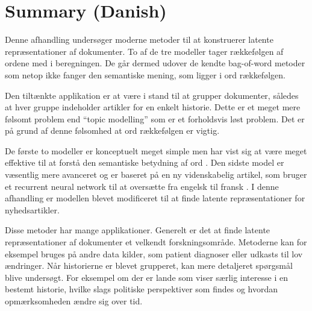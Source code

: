 \chapter{Summary (Danish)}

Denne afhandling undersøger moderne metoder til at konstruerer latente repræsentationer af dokumenter. To af de tre modeller tager rækkefølgen af ordene med i beregningen. De går dermed udover de kendte bag-of-word metoder som netop ikke fanger den semantiske mening, som ligger i ord rækkefølgen.

Den tiltænkte applikation er at være i stand til at grupper dokumenter, således at hver gruppe indeholder artikler for en enkelt historie. Dette er et meget mere følsomt problem end ``topic modelling'' som er et forholdsvis løst problem. Det er på grund af denne følsomhed at ord rækkefølgen er vigtig.

De første to modeller er konceptuelt meget simple men har vist sig at være meget effektive til at forstå den semantiske betydning af ord \cite{word2vec-details, doc2vec}. Den sidste model er væsentlig mere avanceret og er baseret på en ny videnskabelig artikel, som bruger et recurrent neural network til at oversætte fra engelsk til fransk \cite{sutskever}. I denne afhandling er modellen blevet modificeret til at finde latente repræsentationer for nyhedsartikler.

Disse metoder har mange applikationer. Generelt er det at finde latente repræsentationer af dokumenter et velkendt forskningsområde. Metoderne kan for eksempel bruges på andre data kilder, som patient diagnoser eller udkasts til lov ændringer.
Når historierne er blevet grupperet, kan mere detaljeret spørgsmål blive undersøgt. For eksempel om der er lande som viser særlig interesse i en bestemt historie, hvilke slags politiske perspektiver som findes og hvordan opmærksomheden ændre sig over tid.
